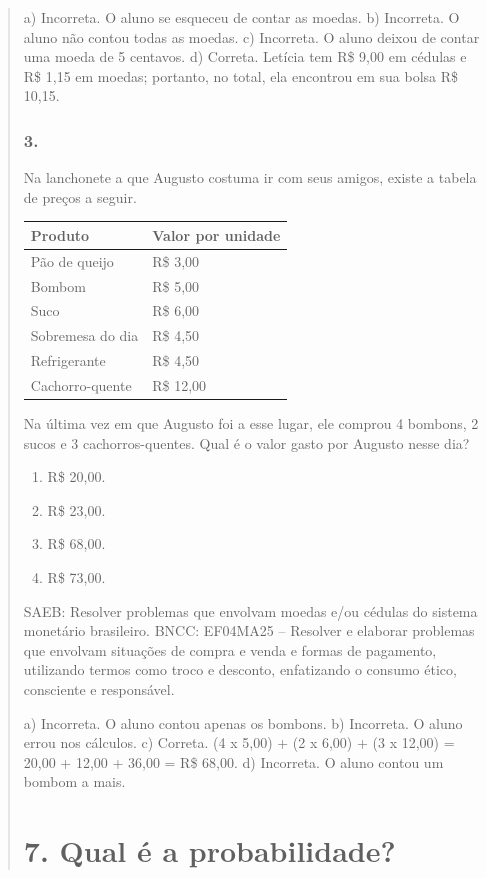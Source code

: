 \begin{enumerate}
\begin{escolha}
\begin{enumerate}
\begin{itemize}
\begin{itemize}
\begin{escolha}
\begin{quote}
\begin{escolha}
a) Incorreta. O aluno se esqueceu de contar as moedas.
b) Incorreta. O aluno não contou todas as moedas.
c) Incorreta. O aluno deixou de contar uma moeda de 5 centavos.
d) Correta. Letícia tem R\$ 9,00 em cédulas e R\$ 1,15 em moedas; portanto, no total, ela
encontrou em sua bolsa R\$ 10,15.

\subsubsection{3.}\label{section-77}

Na lanchonete a que Augusto costuma ir com seus amigos, existe a tabela de preços a seguir.

\begin{longtable}[]{@{}ll@{}}
\toprule
Produto & Valor por unidade\tabularnewline
\midrule
\endhead
Pão de queijo & R\$ 3,00\tabularnewline
Bombom & R\$ 5,00\tabularnewline
Suco & R\$ 6,00\tabularnewline
Sobremesa do dia & R\$ 4,50\tabularnewline
Refrigerante & R\$ 4,50\tabularnewline
Cachorro-quente & R\$ 12,00\tabularnewline
\bottomrule
\end{longtable}

Na última vez em que Augusto foi a esse lugar, ele comprou 4 bombons, 2
sucos e 3 cachorros-quentes. Qual é o valor gasto por Augusto nesse dia?

\begin{enumerate}
\def\labelenumi{\alph{enumi})}
\item
  R\$ 20,00.
\item
  R\$ 23,00.
\item
  R\$ 68,00.
\item
  R\$ 73,00.
\end{enumerate}

SAEB: Resolver problemas que envolvam moedas e/ou cédulas do sistema monetário brasileiro.
BNCC: EF04MA25 -- Resolver e elaborar problemas que envolvam situações de compra e venda e formas
de pagamento, utilizando termos como troco e desconto, enfatizando o consumo ético, consciente e
responsável.

a) Incorreta. O aluno contou apenas os bombons.
b) Incorreta. O aluno errou nos cálculos.
c) Correta. (4 x 5,00) + (2 x 6,00) + (3 x 12,00) = 20,00 + 12,00 + 36,00 = R\$ 68,00.
d) Incorreta. O aluno contou um bombom a mais.


\section{7. Qual é a probabilidade?}\label{muxf3dulo-7}


\end{escolha}
\end{quote}
\end{escolha}
\end{itemize}
\end{itemize}
\end{enumerate}
\end{escolha}
\end{enumerate}
